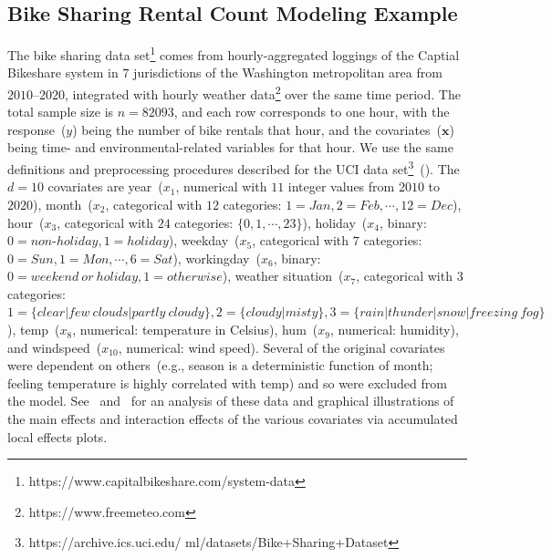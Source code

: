 \documentclass[twoside,11pt]{article}
\begin{document}
\begin{figure}[H]
{}
\label{fig:credit_default_diag}
\end{figure}

\subsection{Bike Sharing Rental Count Modeling Example}
\label{ss:bs_ds}

The bike sharing data set\footnote{https://www.capitalbikeshare.com/system-data} comes from hourly-aggregated loggings of the Captial Bikeshare system in $7$ jurisdictions of the Washington metropolitan area from $2010$--$2020$, integrated with hourly weather data\footnote{https://www.freemeteo.com} over the same time period. The total sample size is $n=82093$, and each row corresponds to one hour, with the response~($y$) being the number of bike rentals that hour, and the covariates~($\bm {x}$) being time- and environmental-related variables for that hour. We use the same definitions and preprocessing procedures described for the UCI data set\footnote{https://archive.ics.uci.edu/
ml/datasets/Bike+Sharing+Dataset}~(\cite{fanaee2014event}). The $d=10$ covariates are year~($x_1$, numerical with $11$ integer values from $2010$ to $2020$), month~($x_2$, categorical with $12$ categories: $1=Jan, 2=Feb, \cdots, 12=Dec$), hour~($x_3$, categorical with $24$ categories: $\{0,1,\cdots,23\}$), holiday~($x_4$, binary: $0=non\text{-}holiday,1=holiday$), weekday~($x_5$, categorical with $7$ categories: 
$0=Sun,1=Mon,\cdots,6=Sat$), workingday~($x_6$, binary: $0=weekend~or~holiday,1=otherwise$), weather situation~($x_7$, categorical with $3$ categories: $1 = \{clear|few~clouds|partly~cloudy\}, 2=\{cloudy|misty\}, 3=\{rain|thunder|snow|freezing~fog\}$), temp~($x_8$, numerical: temperature in Celsius), hum~($x_{9}$, numerical: humidity), and windspeed~($x_{10}$, numerical: wind speed). Several of the original covariates were dependent on others~(e.g., season is a deterministic function of month; feeling temperature is highly correlated with temp) and so were excluded from the model. See~\cite{apley2016visualizing} and~\cite{apley2020visualizing} for an analysis of these data and graphical illustrations of the main effects and interaction effects of the various covariates via accumulated local effects plots.
\end{document}
